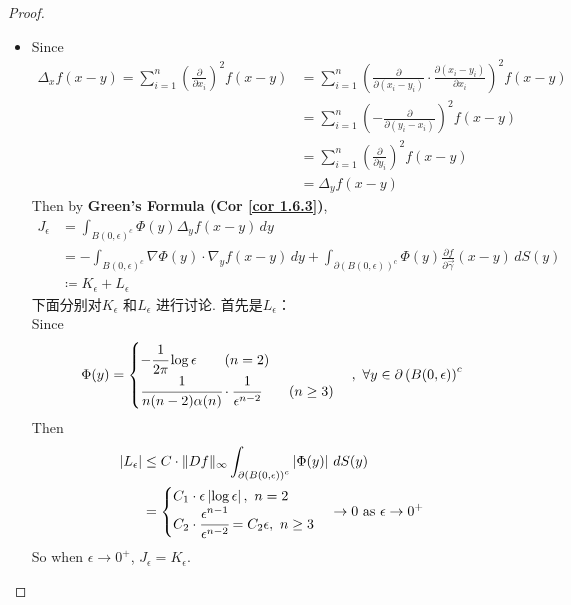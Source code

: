 \begin{thm}
\begin{proof}
\begin{enumerate}
\begin{itemize}
					\item Since
					\begin{align}
						\Delta_x f(x - y) 
						= \sum_{i = 1}^{n} \left( \frac{\partial}{\partial x_i} \right)^2 f(x - y) 
						&= \sum_{i = 1}^n \left( \frac{\partial}{\partial (x_i - y_i)} \cdot \frac{\partial (x_i - y_i)}{\partial x_i} \right)^2 f(x - y) \\
						&= \sum_{i = 1}^n \left( - \frac{\partial}{\partial (y_i - x_i)} \right)^2 f(x - y) \\
						&= \sum_{i = 1}^n \left( \frac{\partial}{\partial y_i} \right)^2 f(x - y) \\
						&= \Delta_y f(x - y)
					\end{align}
					Then by \textbf{Green's Formula (Cor \ref{cor 1.6.3})}, 
					\begin{align}
						J_\epsilon 
						&= \int_{B(0 , \epsilon)^c} \Phi(y) \Delta_y f(x - y) \, dy \\
						&= -\int_{B(0 , \epsilon)^c} \nabla \Phi(y) \cdot \nabla_y f(x - y) \, dy + \int_{\partial \left( B(0 , \epsilon) \right)^c} \Phi(y) \frac{\partial f}{\partial \vec{\gamma}}(x - y) \, dS(y) \\
						&\coloneqq K_\epsilon + L_\epsilon
					\end{align}
					下面分别对$K_\epsilon$ 和$L_\epsilon$ 进行讨论. 首先是$L_\epsilon$：\\
					Since 
					\[ \Phi(y) = 
						\begin{cases}
							-\cfrac{1}{2 \pi} \log \epsilon \hspace*{2em} (n = 2) \\
							\cfrac{1}{n (n - 2) \alpha(n)} \cdot \cfrac{1}{\epsilon^{n - 2}} \hspace*{2em} (n \geq 3)
						\end{cases} , \,\, \forall y \in \partial \left( B(0 , \epsilon) \right)^c
					 \]
					 Then
					\begin{align}
						\left| L_\epsilon \right| 
						&\leq C \cdot \Vert D f \Vert_{\infty} \int_{\partial \left( B(0 , \epsilon) \right)^c} \left| \Phi(y) \right| \, d S(y) \\
						&= 
						\begin{cases}
							C_1 \cdot \epsilon \left| \log \epsilon \right| , \,\, n = 2 \\
							C_2 \cdot \cfrac{\epsilon^{n - 1}}{\epsilon^{n - 2}} = C_2 \epsilon , \,\, n \geq 3
						\end{cases} \to 0 \,\, \text{as} \,\, \epsilon \to 0^+
					\end{align}
					So when $\epsilon \to 0^+$, $J_\epsilon = K_\epsilon$. 
					

\end{itemize}
\end{enumerate}
\end{proof}
\end{thm}
